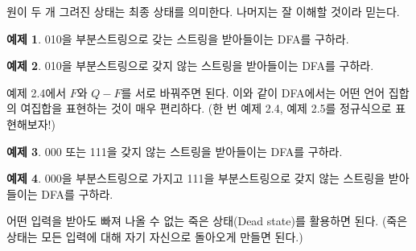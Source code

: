 \documentclass[b5paper]{book}
\theoremstyle{definition}
\newtheorem{ex}{예제}[chapter]
\begin{document}
원이 두 개 그려진 상태는 최종 상태를 의미한다. 나머지는 잘 이해할 것이라 믿는다. 
\begin{ex}
    010을 부분스트링으로 갖는 스트링을 받아들이는 DFA를 구하라.
\end{ex}

\begin{figure}[ht]
    \centering
    \caption{} 
    \label{010}
\end{figure}
\begin{ex}
    010을 부분스트링으로 갖지 않는 스트링을 받아들이는 DFA를 구하라.
\end{ex}
예제 2.4에서 $F$와 $Q-F$를 서로 바꿔주면 된다. 이와 같이 DFA에서는 어떤 언어 집합의
여집합을 표현하는 것이 매우 편리하다. (한 번 예제 2.4, 예제 2.5를 정규식으로 표현해보자!) 
\begin{ex}
    000 또는 111을 갖지 않는 스트링을 받아들이는 DFA를 구하라.
\end{ex}

\begin{ex}
    000을 부분스트링으로 가지고 111을 부분스트링으로 갖지 않는 스트링을 받아들이는 DFA를 구하라.
\end{ex}
어떤 입력을 받아도 빠져 나올 수 없는 죽은 상태(Dead state)를 활용하면 된다. (죽은 
상태는 모든 입력에
대해 자기 자신으로 돌아오게 만들면 된다.)
\end{document}
